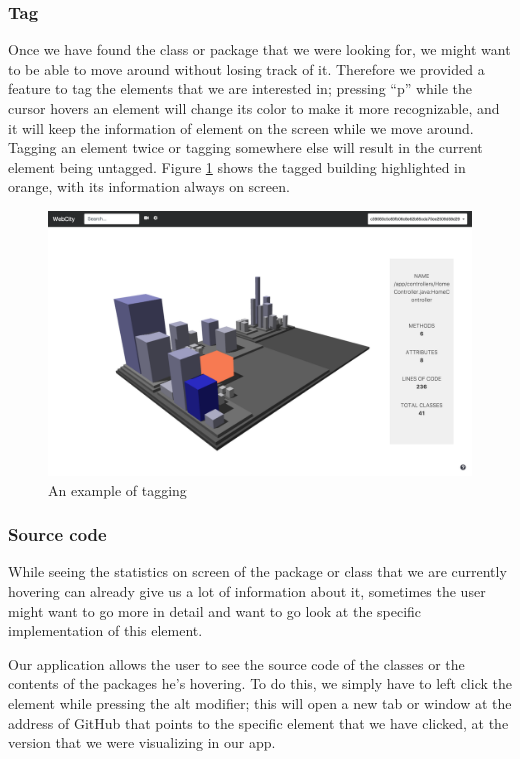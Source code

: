 \documentclass[]{usiinfbachelorproject}
\begin{document}
\subsubsection{Tag} \label{Tag}
Once we have found the class or package that we were looking for, we might want to be able to move around without losing track of it. Therefore we provided a feature to tag the elements
that we are interested in; pressing ``p'' while the cursor hovers an element will change its color to make it more recognizable, and it will keep the information of element on the screen
while we move around. Tagging an element twice or tagging somewhere else will result in the current element being untagged.
Figure \ref{fig:tag} shows the tagged building highlighted in orange, with its information always on screen.

\begin{figure} [H]
\centering
\includegraphics[width=1\textwidth]{pictures/tag.png}
\caption{An example of tagging}
\label{fig:tag}
\end{figure}

\subsubsection{Source code} \label{Source code}
While seeing the statistics on screen of the package or class that we are currently hovering can already give us a lot of information about it, sometimes the user might want to go more in detail and want to go look at the specific implementation of this element.

Our application allows the user to see the source code of the classes or the contents of the packages he's hovering. To do this, we simply have to left click the element while pressing the alt modifier; this will open a new tab or window at the address of GitHub that points to the specific element that we have clicked, at the version that we were visualizing in our app.
\end{document}
